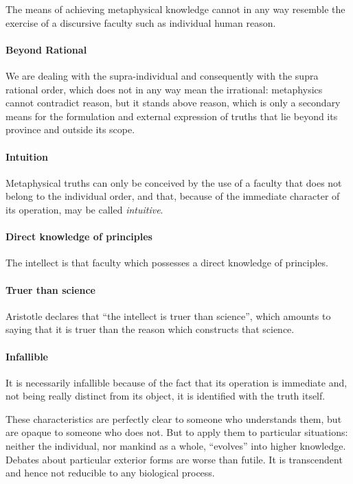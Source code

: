 The means of achieving metaphysical knowledge cannot in any way resemble the exercise of a discursive faculty such as individual human reason.

\paragraph{Beyond Rational}


We are dealing with the supra-individual and consequently with the supra rational order, which does not in any way mean the irrational: metaphysics cannot contradict reason, but it stands above reason, which is only a secondary means for the formulation and external expression of truths that lie beyond its province and outside its scope.

\paragraph{Intuition}


Metaphysical truths can only be conceived by the use of a faculty that does not belong to the individual order, and that, because of the immediate character of its operation, may be called \emph{intuitive}.

\paragraph{Direct knowledge of principles}


The intellect is that faculty which possesses a direct knowledge of principles.

\paragraph{Truer than science}


Aristotle declares that ``the intellect is truer than science'', which amounts to saying that it is truer than the reason which constructs that science.

\paragraph{Infallible}


It is necessarily infallible because of the fact that its operation is immediate and, not being really distinct from its object, it is identified with the truth itself.

These characteristics are perfectly clear to someone who understands them, but are opaque to someone who does not. But to apply them to particular situations: neither the individual, nor mankind as a whole, ``evolves'' into higher knowledge. Debates about particular exterior forms are worse than futile. It is transcendent and hence not reducible to any biological process.


